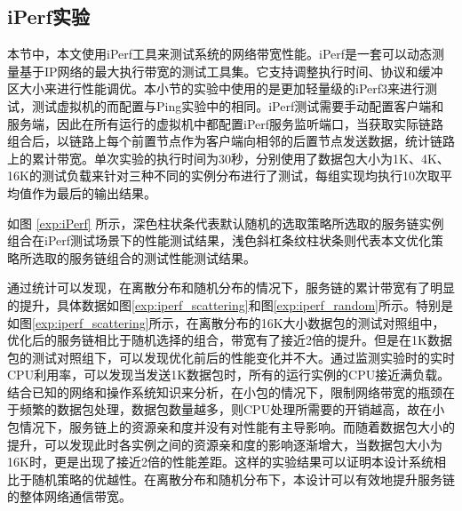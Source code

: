 \subsection{iPerf实验}
本节中，本文使用iPerf工具来测试系统的网络带宽性能。iPerf是一套可以动态测量基于IP网络的最大执行带宽的测试工具集。它支持调整执行时间、协议和缓冲区大小来进行性能调优。本小节的实验中使用的是更加轻量级的iPerf3来进行测试，测试虚拟机的而配置与Ping实验中的相同。iPerf测试需要手动配置客户端和服务端，因此在所有运行的虚拟机中都配置iPerf服务监听端口，当获取实际链路组合后，以链路上每个前置节点作为客户端向相邻的后置节点发送数据，统计链路上的累计带宽。单次实验的执行时间为30秒，分别使用了数据包大小为1K、4K、16K的测试负载来针对三种不同的实例分布进行了测试，每组实现均执行10次取平均值作为最后的输出结果。
\begin{figure}[!htp]
	\centering
\end{figure}
\begin{figure}
	\addtocounter{subfigure}{2}
	\ContinuedFloat
	\centering
\end{figure}

如图 \ref{exp:iPerf} 所示，深色柱状条代表默认随机的选取策略所选取的服务链实例组合在iPerf测试场景下的性能测试结果，浅色斜杠条纹柱状条则代表本文优化策略所选取的服务链组合的测试性能测试结果。

通过统计可以发现，在离散分布和随机分布的情况下，服务链的累计带宽有了明显的提升，具体数据如图\ref{exp:iperf_scattering}和图\ref{exp:iperf_random}所示。特别是如图\ref{exp:iperf_scattering}所示，在离散分布的16K大小数据包的测试对照组中，优化后的服务链相比于随机选择的组合，带宽有了接近2倍的提升。但是在1K数据包的测试对照组下，可以发现优化前后的性能变化并不大。通过监测实验时的实时CPU利用率，可以发现当发送1K数据包时，所有的运行实例的CPU接近满负载。结合已知的网络和操作系统知识来分析，在小包的情况下，限制网络带宽的瓶颈在于频繁的数据包处理，数据包数量越多，则CPU处理所需要的开销越高，故在小包情况下，服务链上的资源亲和度并没有对性能有主导影响。而随着数据包大小的提升，可以发现此时各实例之间的资源亲和度的影响逐渐增大，当数据包大小为16K时，更是出现了接近2倍的性能差距。这样的实验结果可以证明本设计系统相比于随机策略的优越性。在离散分布和随机分布下，本设计可以有效地提升服务链的整体网络通信带宽。


